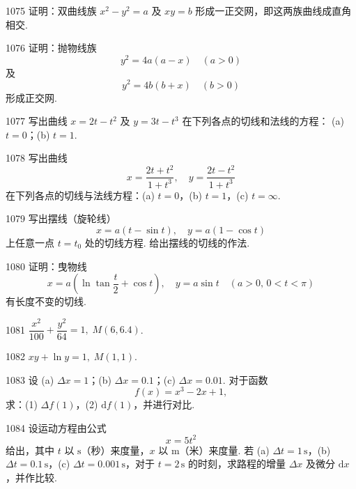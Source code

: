 \begin{prob}[M]{1075}
证明：双曲线族 $x^2 - y^2 = a$ 及 $xy = b$ 形成一正交网，即这两族曲线成直角相交.
\end{prob}

\begin{prob}[M]{1076}
证明：抛物线族
\[
y^2 = 4a(a - x) \quad (a > 0)
\]
及
\[
y^2 = 4b(b + x) \quad (b > 0)
\]
形成正交网.
\end{prob}

\begin{prob}[M]{1077}
写出曲线 $x = 2t - t^2$ 及 $y = 3t - t^3$ 在下列各点的切线和法线的方程：
(a) $t = 0$；\qquad (b) $t = 1$.
\end{prob}

\begin{prob}[L]{1078}
写出曲线
\[
x = \frac{2t + t^2}{1 + t^3}, \quad y = \frac{2t - t^2}{1 + t^3}
\]
在下列各点的切线与法线方程：(a) $t = 0$，(b) $t = 1$，(c) $t = \infty$.
\end{prob}

\begin{prob}[M]{1079}
写出摆线（旋轮线）
\[
x = a(t - \sin t), \quad y = a(1 - \cos t)
\]
上任意一点 $t = t_0$ 处的切线方程. 给出摆线的切线的作法.
\end{prob}

\begin{prob}[M]{1080}
证明：曳物线
\[
x = a\left(\ln \tan \frac{t}{2} + \cos t\right), \quad y = a\sin t \quad (a > 0, \, 0 < t < \pi)
\]
有长度不变的切线.
\end{prob}


\begin{prob}[S]{1081}
$\dfrac{x^2}{100} + \dfrac{y^2}{64} = 1, \; M(6, 6.4)$.
\end{prob}

\begin{prob}[S]{1082}
$xy + \ln y = 1, \; M(1, 1)$.
\end{prob}


\begin{prob}[L]{1083}
设
(a) $\Delta x = 1$；\qquad (b) $\Delta x = 0.1$；\qquad (c) $\Delta x = 0.01$.
对于函数
\[
f(x) = x^3 - 2x + 1,
\]
求：(1) $\Delta f(1)$，(2) $\mathrm{d}f(1)$，并进行对比.
\end{prob}

\begin{prob}[L]{1084}
设运动方程由公式
\[
x = 5t^2
\]
给出，其中 $t$ 以 $\mathrm{s}$（秒）来度量，$x$ 以 $\mathrm{m}$（米）来度量. 若 (a) $\Delta t = 1\,\mathrm{s}$，(b) $\Delta t = 0.1\,\mathrm{s}$，(c) $\Delta t = 0.001\,\mathrm{s}$，对于 $t = 2\,\mathrm{s}$ 的时刻，求路程的增量 $\Delta x$ 及微分 $\mathrm{d}x$，并作比较.
\end{prob}

